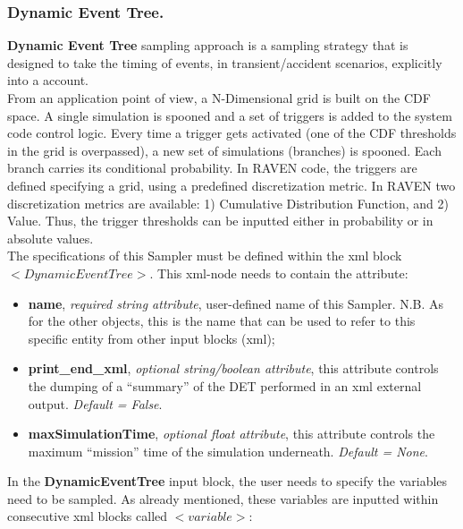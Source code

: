\subsubsection{Dynamic Event Tree.}
\label{subsubsubsec:DET}
\textbf{Dynamic Event Tree} sampling approach is a sampling strategy that is designed to take the timing of events, in transient/accident scenarios, explicitly into a account.
\\ From an application point of view, a N-Dimensional grid is built on the CDF space. A single simulation is spooned and a set of triggers is added to the system code control logic. Every time a trigger gets activated (one of the CDF thresholds in the grid is overpassed), a new set of simulations (branches) is spooned. Each branch carries its conditional probability. In RAVEN code, the triggers are defined specifying a grid, using a predefined discretization metric.
In RAVEN two discretization metrics are available: 1) Cumulative Distribution Function, and 2) Value. Thus, the trigger thresholds can be inputted either in probability or in absolute values.
\\ The specifications of this Sampler must be defined within the xml block $<DynamicEventTree>$. This xml-node needs to contain the attribute:
\begin{itemize}
\itemsep0em
\item \textbf{name}, \textit{required string attribute}, user-defined name of this Sampler. N.B. As for the other objects, this is the name that can be used to refer to this specific entity from other input blocks (xml);
\item \textbf{print\_end\_xml}, \textit{optional string/boolean attribute}, this attribute controls the dumping of a ``summary'' of the DET performed in an xml external output. \textit{Default = False}.
\item \textbf{maxSimulationTime}, \textit{optional float attribute}, this attribute controls the maximum ``mission'' time of the simulation underneath. \textit{Default = None}.
\end{itemize}
In the \textbf{DynamicEventTree} input block, the user needs to specify the variables need to be sampled. As already mentioned, these variables are inputted within consecutive xml blocks called $<variable>$:
